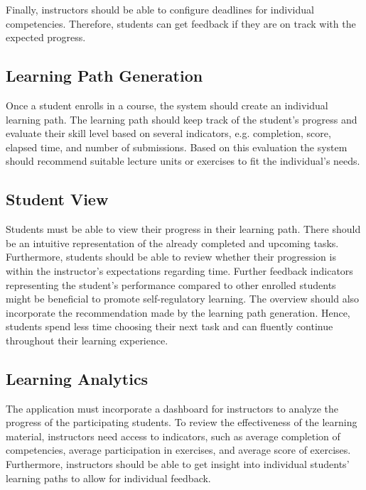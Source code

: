 \documentclass[a4paper,12pt,twoside]{article}
\begin{document}
Finally, instructors should be able to configure deadlines for individual competencies. Therefore, students can get feedback if they are on track with the
expected progress.

\subsection{Learning Path Generation}
Once a student enrolls in a course, the system should create an individual learning path. The learning path should keep track of the student's progress and evaluate
their skill level based on several indicators, e.g. completion, score, elapsed time, and number of submissions. Based on this evaluation the system should
recommend suitable lecture units or exercises to fit the individual's needs.

\subsection{Student View}
Students must be able to view their progress in their learning path. There should be an intuitive representation of the already completed and upcoming tasks.
Furthermore, students should be able to review whether their progression is within the instructor's expectations regarding time. Further feedback indicators
representing the student's performance compared to other enrolled students might be beneficial to promote self-regulatory learning.
The overview should also incorporate the recommendation made by the learning path generation. Hence, students spend less time choosing their next task and can fluently
continue throughout their learning experience.

\subsection{Learning Analytics}
The application must incorporate a dashboard for instructors to analyze the progress of the participating students. To review the effectiveness of the learning material,
instructors need access to indicators, such as average completion of competencies, average participation in exercises, and average score of exercises.
Furthermore, instructors should be able to get insight into individual students' learning paths to allow for individual feedback.
\end{document}

